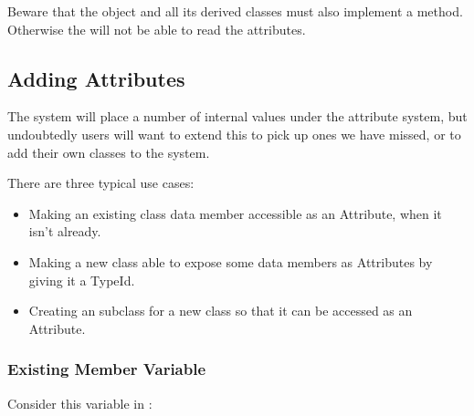 \documentclass[letterpaper,10pt,english]{sphinxmanual}
\renewcommand{\sphinxcode}[1]{\texttt{\small{#1}}}
\begin{document}
\begin{sphinxVerbatim}[commandchars=\\\{\}]
 
    
\end{sphinxVerbatim}

Beware that the object and all its derived classes must also implement
a \sphinxcode{} method. Otherwise
the \sphinxcode{} will not be able to read
the attributes.


\subsection{Adding Attributes}
\label{\detokenize{attributes:adding-attributes}}
The  system will place a number of internal values under the attribute
system, but undoubtedly users will want to extend this to pick up ones we have
missed, or to add their own classes to the system.

There are three typical use cases:
\begin{itemize}
\item {} 
Making an existing class data member accessible as an Attribute,
when it isn’t already.

\item {} 
Making a new class able to expose some data members as Attributes
by giving it a TypeId.

\item {} 
Creating an \sphinxcode{} subclass for a new class
so that it can be accessed as an Attribute.

\end{itemize}


\subsubsection{Existing Member Variable}
\label{\detokenize{attributes:existing-member-variable}}
Consider this variable in \sphinxcode{}:

\begin{sphinxVerbatim}[commandchars=\\\{\}]
    
\end{sphinxVerbatim}
\end{document}
